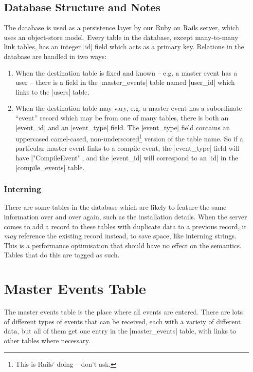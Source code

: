 \documentclass{report}
\begin{document}
\section{Database Structure and Notes}
\label{sec:assoc}

The database is used as a persistence layer by our Ruby on Rails server, which
uses an object-store model.  Every table in the database, except many-to-many link tables, has an
integer |id| field which acts as a primary key.  Relations in the database are
handled in two ways:

\begin{enumerate}
\item When the destination table is fixed and known -- e.g. a master event has a user --
  there is a field in the |master_events| table named |user_id| which links to
  the |users| table.
\item When the destination table may vary, e.g. a master event has a subordinate
  ``event'' record which may be from one of many tables, there is both an
  |event_id| and an |event_type| field.  The |event_type| field contains an
  uppercased camel-cased, non-underscored\footnote{This is Rails' doing -- don't ask.} version
  of the table name.  So if a particular master event links to a compile
  event, the |event_type| field will have |"CompileEvent"|, and the |event_id|
  will correspond to an |id| in the |compile_events| table.
\end{enumerate}

\subsection{Interning}
\label{def:intern}

There are some tables in the database which are likely to feature the same
information over and over again, such as the installation details.  When the
server comes to add a record to these tables with duplicate data to a previous
record, it \textit{may} reference the existing record instead, to save space, like
interning strings.  This is a performance optimisation that should have no
effect on the semantics.  Tables that do this are tagged as such.

\chapter{Master Events Table}
\label{sec:master_events}

The master events table is the place where all events are entered.  There are
lots of different types of events that can be received, each with a variety of
different data, but all of them get one entry in the |master_events|
table, with links to other tables where necessary.
\end{document}
